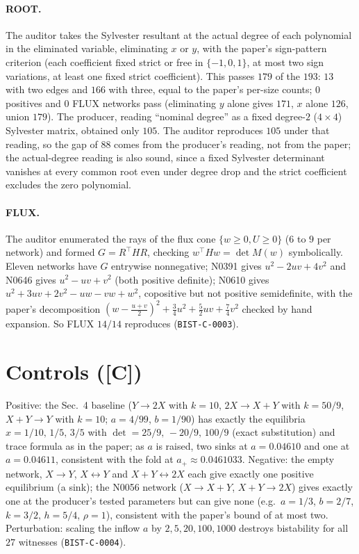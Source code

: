 \documentclass[10pt]{article}
\newcommand{\tier}[1]{\textsf{[#1]}}
\newcommand{\tC}{\tier{C}}
\begin{document}
\paragraph{ROOT.} The auditor takes the Sylvester resultant at the actual degree of each polynomial in the eliminated variable, eliminating $x$ or $y$, with the paper's sign-pattern criterion (each coefficient fixed strict or free in $\{-1,0,1\}$, at most two sign variations, at least one fixed strict coefficient). This passes $179$ of the $193$: $13$ with two edges and $166$ with three, equal to the paper's per-size counts; $0$ positives and $0$ FLUX networks pass (eliminating $y$ alone gives $171$, $x$ alone $126$, union $179$). The producer, reading ``nominal degree'' as a fixed degree-$2$ ($4\times4$) Sylvester matrix, obtained only $105$. The auditor reproduces $105$ under that reading, so the gap of $88$ comes from the producer's reading, not from the paper; the actual-degree reading is also sound, since a fixed Sylvester determinant vanishes at every common root even under degree drop and the strict coefficient excludes the zero polynomial.
\paragraph{FLUX.} The auditor enumerated the rays of the flux cone $\{w\ge0,U\ge0\}$ ($6$ to $9$ per network) and formed $G=R^{\!\top}HR$, checking $w^{\top}Hw=\det M(w)$ symbolically. Eleven networks have $G$ entrywise nonnegative; N0391 gives $u^2-2uv+4v^2$ and N0646 gives $u^2-uv+v^2$ (both positive definite); N0610 gives $u^2+3uv+2v^2-uw-vw+w^2$, copositive but not positive semidefinite, with the paper's decomposition $(w-\tfrac{u+v}2)^2+\tfrac34u^2+\tfrac52uv+\tfrac74v^2$ checked by hand expansion. So FLUX $14/14$ reproduces (\texttt{BIST-C-0003}).

\section{Controls (\tC{})}\label{sec:ctrl}
Positive: the Sec.~4 baseline ($Y\to2X$ with $k=10$, $2X\to X+Y$ with $k=50/9$, $X+Y\to Y$ with $k=10$; $a=4/99$, $b=1/90$) has exactly the equilibria $x=1/10,\,1/5,\,3/5$ with $\det=25/9,\,-20/9,\,100/9$ (exact substitution) and trace formula as in the paper; as $a$ is raised, two sinks at $a=0.04610$ and one at $a=0.04611$, consistent with the fold at $a_+\approx0.0461033$. Negative: the empty network, $X\to Y$, $X\leftrightarrow Y$ and $X+Y\leftrightarrow2X$ each give exactly one positive equilibrium (a sink); the N0056 network ($X\to X+Y$, $X+Y\to2X$) gives exactly one at the producer's tested parameters but can give none (e.g.\ $a=1/3$, $b=2/7$, $k=3/2$, $h=5/4$, $\rho=1$), consistent with the paper's bound of at most two. Perturbation: scaling the inflow $a$ by $2,5,20,100,1000$ destroys bistability for all $27$ witnesses (\texttt{BIST-C-0004}).
\end{document}
